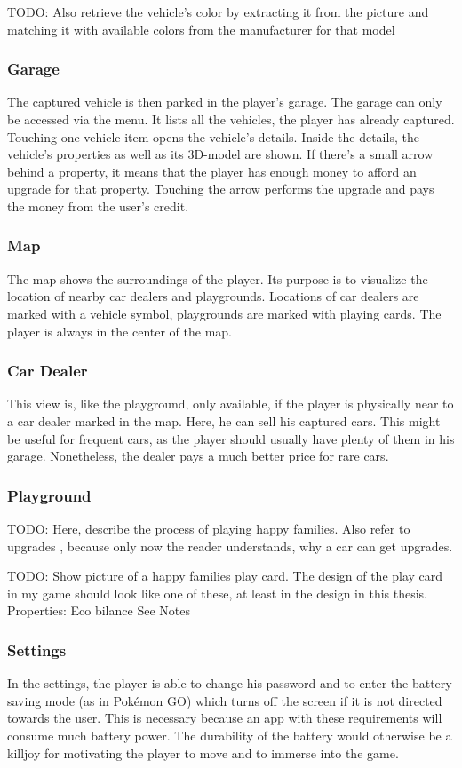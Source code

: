TODO: Also retrieve the vehicle’s color by extracting it from the picture and matching it with available colors from the manufacturer for that model

\subsubsection{Garage}
The captured vehicle is then parked in the player’s garage. The garage can only be accessed via the menu. It lists all the vehicles, the player has already captured. Touching one vehicle item opens the vehicle’s details. Inside the details, the vehicle’s properties as well as its 3D-model are shown. If there’s a small arrow behind a property, it means that the player has enough money to afford an upgrade for that property. Touching the arrow performs the upgrade and pays the money from the user's credit.

\subsubsection{Map}
The map shows the surroundings of the player. Its purpose is to visualize the location of nearby car dealers and playgrounds. Locations of car dealers are marked with a vehicle symbol, playgrounds are marked with playing cards. The player is always in the center of the map.

\subsubsection{Car Dealer}
This view is, like the playground, only available, if the player is physically near to a car dealer marked in the map. Here, he can sell his captured cars. This might be useful for frequent cars, as the player should usually have plenty of them in his garage. Nonetheless, the dealer pays a much better price for rare cars.

\subsubsection{Playground}
TODO: Here, describe the process of playing happy families. Also refer to upgrades , because only now the reader understands, why a car can get upgrades.

TODO: Show picture of a happy families play card.
The design of the play card in my game should look like one of these, at least in the design in this thesis.
Properties:
Eco bilance
See Notes

\subsubsection{Settings}
In the settings, the player is able to change his password and to enter the battery saving mode (as in Pokémon GO) which turns off the screen if it is not directed towards the user. This is necessary because an app with these requirements will consume much battery power. The durability of the battery would otherwise be a killjoy for motivating the player to move and to immerse into the game.

